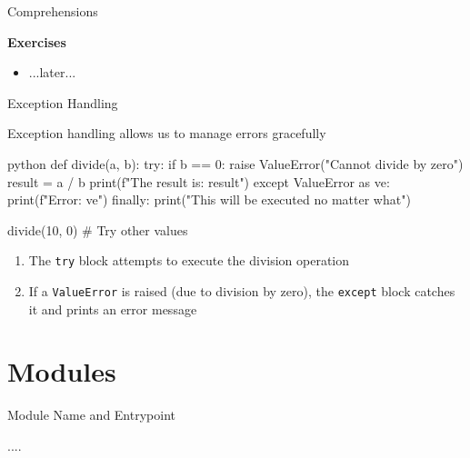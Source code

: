 \documentclass[
	11pt, 
]{beamer}
\begin{document}

\begin{frame}[fragile]{Comprehensions}

\begin{alertblock}{\textbf{Exercises}}
    \begin{itemize}
        \item ...later...
    \end{itemize}
\end{alertblock}
\end{frame}



\begin{frame}[fragile]{Exception Handling}

Exception handling allows us to manage errors gracefully

\begin{mintedbox}{python}
def divide(a, b):
    try:
        if b == 0:
            raise ValueError("Cannot divide by zero")
        result = a / b
        print(f"The result is: {result}")
    except ValueError as ve:
        print(f"Error: {ve}")
    finally:
        print("This will be executed no matter what")

divide(10, 0) # Try other values
\end{mintedbox}

\begin{enumerate}
    \item The \texttt{try} block attempts to execute the division operation
    \item If a \texttt{ValueError} is raised (due to division by zero), the \texttt{except} block catches it and prints an error message
\end{enumerate}

\end{frame}


\section{Modules}
\begin{frame}[fragile]{Module Name and Entrypoint}

....

\end{frame}
\end{document}
